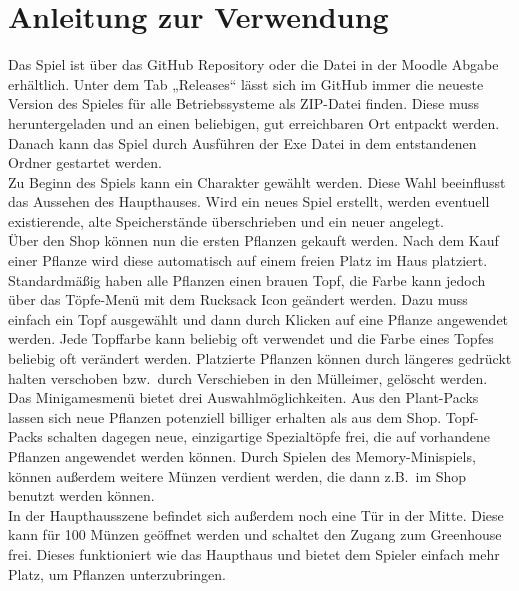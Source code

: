 \chapter{Anleitung zur Verwendung}\label{ch:anleitung}
Das Spiel ist über das GitHub Repository oder die Datei in der Moodle Abgabe erhältlich. 
Unter dem Tab „Releases“ lässt sich im GitHub immer die neueste Version des Spieles für alle Betriebssysteme als 
ZIP-Datei finden. 
Diese muss heruntergeladen und an einen beliebigen, gut erreichbaren Ort entpackt werden. 
Danach kann das Spiel durch Ausführen der Exe Datei in dem entstandenen Ordner gestartet werden.\\
\newline
Zu Beginn des Spiels kann ein Charakter gewählt werden. 
Diese Wahl beeinflusst das Aussehen des Haupthauses. 
Wird ein neues Spiel erstellt, werden eventuell existierende, alte Speicherstände überschrieben und ein neuer angelegt.\\
\newline
Über den Shop können nun die ersten Pflanzen gekauft werden. 
Nach dem Kauf einer Pflanze wird diese automatisch auf einem freien Platz im Haus platziert. 
Standardmäßig haben alle Pflanzen einen brauen Topf, die Farbe kann jedoch über das Töpfe-Menü mit dem Rucksack Icon 
geändert werden. 
Dazu muss einfach ein Topf ausgewählt und dann durch Klicken auf eine Pflanze angewendet werden. 
Jede Topffarbe kann beliebig oft verwendet und die Farbe eines Topfes beliebig oft verändert werden. 
Platzierte Pflanzen können durch längeres gedrückt halten verschoben bzw.\ durch Verschieben in den Mülleimer, 
gelöscht werden.\\
\newline
Das Minigamesmenü bietet drei Auswahlmöglichkeiten. 
Aus den Plant-Packs lassen sich neue Pflanzen potenziell billiger erhalten als aus dem Shop. 
Topf-Packs schalten dagegen neue, einzigartige Spezialtöpfe frei, die auf vorhandene Pflanzen angewendet werden können. 
Durch Spielen des Memory-Minispiels, können außerdem weitere Münzen verdient werden, die dann z.B.\ im Shop benutzt 
werden können.\\
\newline
In der Haupthausszene befindet sich außerdem noch eine Tür in der Mitte. 
Diese kann für 100 Münzen geöffnet werden und schaltet den Zugang zum Greenhouse frei. 
Dieses funktioniert wie das Haupthaus und bietet dem Spieler einfach mehr Platz, um Pflanzen unterzubringen.\\
